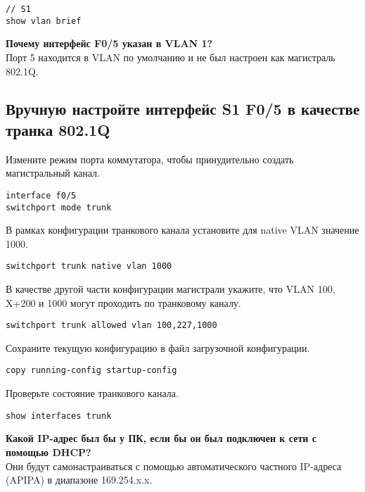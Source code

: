 \begin{verbatim}
// S1
show vlan brief
\end{verbatim}

\textbf{Почему интерфейс F0/5 указан в VLAN 1?}\\
Порт 5 находится в VLAN по умолчанию и не был настроен как магистраль 802.1Q.

\subsection{Вручную настройте интерфейс S1 F0/5 в качестве транка 802.1Q}

Измените режим порта коммутатора,
чтобы принудительно создать магистральный канал.

\begin{verbatim}
interface f0/5
switchport mode trunk
\end{verbatim}

В рамках конфигурации транкового канала установите
для native VLAN значение 1000.

\begin{verbatim}
switchport trunk native vlan 1000
\end{verbatim}

В качестве другой части конфигурации магистрали укажите, что VLAN 100, X+200 и 1000 могут проходить по транковому каналу.

\begin{verbatim}
switchport trunk allowed vlan 100,227,1000
\end{verbatim}

Сохраните текущую конфигурацию в файл загрузочной конфигурации.

\begin{verbatim}
copy running-config startup-config
\end{verbatim}

Проверьте состояние транкового канала.

\begin{verbatim}
show interfaces trunk
\end{verbatim}

\textbf{Какой IP-адрес был бы у ПК,
    если бы он был подключен к сети с помощью DHCP?}\\
Они будут самонастраиваться с помощью автоматического
частного IP-адреса (APIPA) в диапазоне 169.254.x.x.